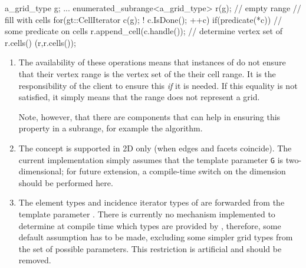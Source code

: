 \begin{example}
  a\_grid\_type g;
  ...
  enumerated\_subrange<a\_grid\_type>  r(g); // empty range
  // fill with cells
  for(gt::CellIterator c(g); ! c.IsDone(); ++c)
    if(predicate(*c)) // some predicate on cells
      r.append_cell(c.handle());
  // determine vertex set of r.cells()
  (r,r.cells());
  
\end{example}
\begin{enumerate}
\item {}
  The availability of these operations means that
  instances of  
  do not ensure that their 
  vertex range is the vertex set of the 
  their cell range.
  It is the responsibility of the client to ensure this 
  {\em if\/} it is needed.
  If this equality is not satisfied, it simply means that the range
  does not represent a  grid.

  Note, however, that there are components that can help in ensuring
  this property in a subrange, for example the 
    algorithm.


\item {}
  The   concept
  is supported in 2D only (when edges and facets coincide).
  The current implementation simply assumes that the template parameter
  {\tt G} is two-dimensional; for future extension, 
  a compile-time switch on the dimension should be performed here.
\item {}
  The element types and incidence iterator types of
    are forwarded from the template
   parameter . There is currently no mechanism implemented
   to determine at compile time which types are provided by ,
   therefore, some default assumption has to be made, excluding 
   some simpler grid types from the set of possible parameters.
   This restriction is artificial and should be removed.
\end{enumerate}


 ~
 ~
